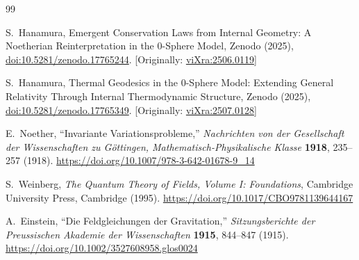 \documentclass[%
 reprint,
 amsmath,amssymb,
 aps,
]{revtex4-1}
\numberwithin{equation}{section}%
\begin{document}
\begin{thebibliography}{99}

S.~Hanamura, Emergent Conservation Laws from Internal Geometry: A Noetherian Reinterpretation in the 0-Sphere Model, Zenodo (2025), \href{https://doi.org/10.5281/zenodo.17765244}{doi:10.5281/zenodo.17765244}. [Originally: \href{https://vixra.org/abs/2506.0119}{viXra:2506.0119}]

S.~Hanamura, Thermal Geodesics in the 0-Sphere Model: Extending General Relativity Through Internal Thermodynamic Structure, Zenodo (2025), \href{https://doi.org/10.5281/zenodo.17765349}{doi:10.5281/zenodo.17765349}. [Originally: \href{https://vixra.org/abs/2507.0128}{viXra:2507.0128}]

E.~Noether, 
``Invariante Variationsprobleme,'' 
\textit{Nachrichten von der Gesellschaft der Wissenschaften zu Göttingen, Mathematisch-Physikalische Klasse} \textbf{1918}, 235--257 (1918).
\href{https://doi.org/10.1007/978-3-642-01678-9_14}{https://doi.org/10.1007/978-3-642-01678-9\_14}

S.~Weinberg, 
\textit{The Quantum Theory of Fields, Volume I: Foundations}, 
Cambridge University Press, Cambridge (1995).
\href{https://doi.org/10.1017/CBO9781139644167}{https://doi.org/10.1017/CBO9781139644167}

A.~Einstein, 
``Die Feldgleichungen der Gravitation,'' 
\textit{Sitzungsberichte der Preussischen Akademie der Wissenschaften} \textbf{1915}, 844--847 (1915).
\href{https://doi.org/10.1002/3527608958.glos0024}{https://doi.org/10.1002/3527608958.glos0024}


\end{thebibliography}
\end{document}
